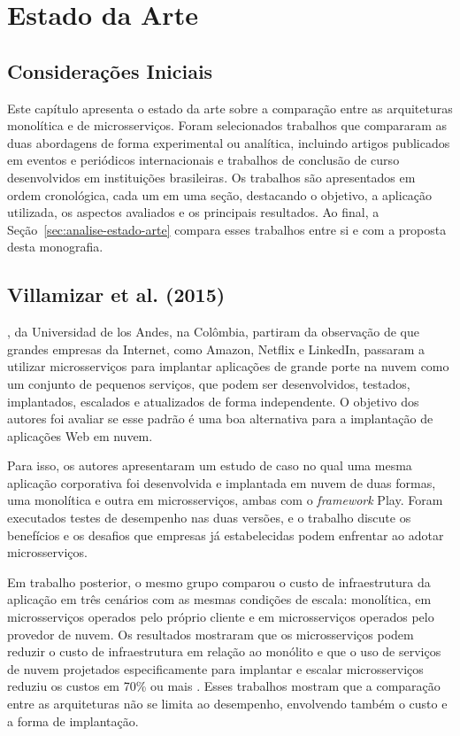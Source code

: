 \chapter{Estado da Arte}
\label{cap:estado-arte}

\section{Considerações Iniciais}

Este capítulo apresenta o estado da arte sobre a comparação entre as arquiteturas monolítica e
de microsserviços. Foram selecionados trabalhos que compararam as duas abordagens de forma
experimental ou analítica, incluindo artigos publicados em eventos e periódicos internacionais
e trabalhos de conclusão de curso desenvolvidos em instituições brasileiras. Os trabalhos são
apresentados em ordem cronológica, cada um em uma seção, destacando o objetivo, a aplicação
utilizada, os aspectos avaliados e os principais resultados. Ao final, a
Seção~\ref{sec:analise-estado-arte} compara esses trabalhos entre si e com a proposta desta
monografia.

\section{Villamizar et al. (2015)}

, da Universidad de los Andes, na Colômbia, partiram da observação
de que grandes empresas da Internet, como Amazon, Netflix e LinkedIn, passaram a utilizar
microsserviços para implantar aplicações de grande porte na nuvem como um conjunto de pequenos
serviços, que podem ser desenvolvidos, testados, implantados, escalados e atualizados de forma
independente. O objetivo dos autores foi avaliar se esse padrão é uma boa alternativa para a
implantação de aplicações Web em nuvem.

Para isso, os autores apresentaram um estudo de caso no qual uma mesma aplicação corporativa
foi desenvolvida e implantada em nuvem de duas formas, uma monolítica e outra em
microsserviços, ambas com o \textit{framework} Play. Foram executados testes de desempenho nas
duas versões, e o trabalho discute os benefícios e os desafios que empresas já estabelecidas
podem enfrentar ao adotar microsserviços.

Em trabalho posterior, o mesmo grupo comparou o custo de infraestrutura da aplicação em três
cenários com as mesmas condições de escala: monolítica, em microsserviços operados pelo próprio
cliente e em microsserviços operados pelo provedor de nuvem. Os resultados mostraram que os
microsserviços podem reduzir o custo de infraestrutura em relação ao monólito e que o uso de
serviços de nuvem projetados especificamente para implantar e escalar microsserviços reduziu
os custos em 70\% ou mais \cite{villamizar2016}. Esses trabalhos mostram que a comparação entre
as arquiteturas não se limita ao desempenho, envolvendo também o custo e a forma de
implantação.

